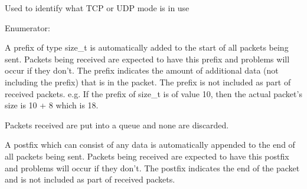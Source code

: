 Used to identify what TCP or UDP mode is in use \begin{Desc}
\item[Enumerator: ]\par
\begin{description}
\item[{\em 
\hypertarget{classcl_shared_protocol_a4b0b9c82b8ae4eee78c6308c35afd47ba9f62bd1b819b8a5d53e6f0b679495c61}{
TM\_\-SIZE}
\label{classcl_shared_protocol_a4b0b9c82b8ae4eee78c6308c35afd47ba9f62bd1b819b8a5d53e6f0b679495c61}
}]A prefix of type size\_\-t is automatically added to the start of all packets being sent. Packets being received are expected to have this prefix and problems will occur if they don't. The prefix indicates the amount of additional data (not including the prefix) that is in the packet. The prefix is not included as part of received packets. e.g. If the prefix of size\_\-t is of value 10, then the actual packet's size is 10 + 8 which is 18. \par
\par


Packets received are put into a queue and none are discarded.\par
\par
 \item[{\em 
\hypertarget{classcl_shared_protocol_a4b0b9c82b8ae4eee78c6308c35afd47ba399adc08f122d7c09a83610197d24666}{
TM\_\-RN}
\label{classcl_shared_protocol_a4b0b9c82b8ae4eee78c6308c35afd47ba399adc08f122d7c09a83610197d24666}
}]A postfix which can consist of any data is automatically appended to the end of all packets being sent. Packets being received are expected to have this postfix and problems will occur if they don't. The postfix indicates the end of the packet and is not included as part of received packets.\par
\par



\end{description}
\end{Desc}
